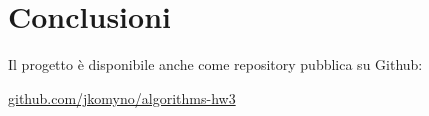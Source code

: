 \section{Conclusioni}
\label{cap:conclusions}

\noindent Il progetto è disponibile anche come repository pubblica su Github:

\begin{center}
\href{https://github.com/jkomyno/algorithms-hw3}{github.com/jkomyno/algorithms-hw3}
\end{center}
